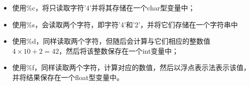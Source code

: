 \begin{frame}[fragile]
\begin{itemize}
\item 使用{\tf \%c}，将只读取字符{\tf '4'}并将其存储在一个char型变量中；\\[0.1in]
\item 使用{\tf \%s}，会读取两个字符，即字符{\tf '4'}和{\tf '2'}，并将它们存储在一个字符串中\\[0.1in]
\item 使用{\tf \%d}，同样读取两个字符，但随后会计算与它们相应的整数值$4\times 10+2=42$，然后将该整数保存在一个int变量中；\\[0.1in]
\item 使用{\tf \%f}，同样读取两个字符，计算对应的数值{}，然后以浮点表示法表示该值，并将结果保存在一个float型变量中。
\end{itemize}
\end{frame}
